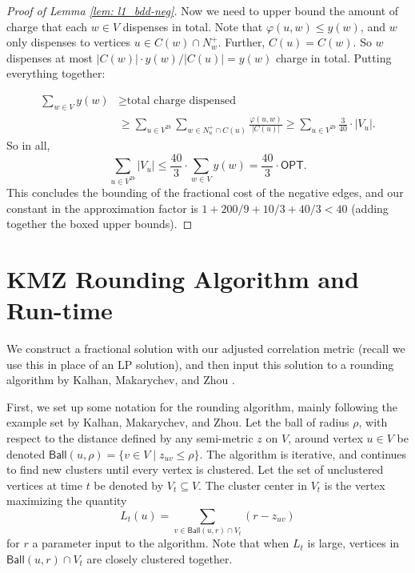 \begin{proof}[Proof of Lemma \ref{lem: l1_bdd-neg}]
Now we need to upper bound the amount of charge that each $w \in V$ dispenses in total. Note that $\varphi(u,w) \leq y(w)$, and $w$ only dispenses to vertices $u \in C(w) \cap N_w^+$. Further, $C(u) = C(w)$. So $w$ dispenses at most $|C(w)| \cdot y(w)/|C(u)| = y(w)$ charge in total. Putting everything together: 

\begin{align*}
     \sum_{w \in V} y(w) &\geq \text{total charge dispensed} \\
     &\geq \sum_{u \in V^{2b}}  \sum_{w \in N_u^+ \cap C(u)} \frac{\varphi(u,w)}{|C(u)|} 
     \geq \sum_{u \in V^{2b}} \frac{3}{40} \cdot |V_u|.
 \end{align*}
 So in all,
 \[\boxed{\sum_{u \in V^{2b}} |V_u| \leq \frac{40}{3} \cdot \sum_{w \in V} y(w) = \frac{40}{3} \cdot \textsf{OPT}.}\]
This concludes the bounding of the fractional cost of the negative edges, 
and our constant in the approximation factor is $1 + 200/9 + 10/3 + 40/3 < 40$ (adding together the boxed upper bounds). 



\end{proof}

\section{KMZ Rounding Algorithm and Run-time}
\label{sec: lp_rounding_alg}

We construct a fractional solution with our adjusted correlation metric (recall we use this in place of an LP solution), and then
input this solution to a rounding algorithm by Kalhan, Makarychev, and Zhou \citeyearpar{KMZ19}.

First, we set up some notation for the rounding algorithm, 
mainly following the example set by Kalhan, Makarychev, and Zhou.
Let the ball of radius $\rho$, with respect to the distance defined by 
any semi-metric $z$ on $V$, around vertex $u \in V$ 
be denoted $\textsf{Ball}(u,\rho) = \{v \in V \mid z_{uv} \leq \rho\}$.
The algorithm is iterative, and continues to find new clusters until every vertex is clustered.
Let the set of unclustered vertices at time $t$ be denoted by $V_t \subseteq V$.
The cluster center in $V_t$ is the vertex maximizing the quantity
$$
L_t(u)= \sum_{v \in \textsf{Ball}(u,r) \cap V_t} (r-z_{uv})
$$
for $r$ a parameter input to the algorithm.
Note that when $L_t$ is large,
vertices in $\textsf{Ball}(u,r) \cap V_t$ are closely clustered together.\\



